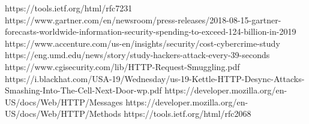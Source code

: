 \documentclass[
fontsize=11pt,
paper=a4,
abstract=true,
numbers=noenddot,
listof=totoc,
bibliography=totoc,
oneside,
cleardoublepage=plain,
parskip=half+, %
BCOR=1cm, %
]{scrreprt}
\begin{document}
















\begin{thebibliography}{00}
	 https://tools.ietf.org/html/rfc7231 
	 https://www.gartner.com/en/newsroom/press-releases/2018-08-15-gartner-forecasts-worldwide-information-security-spending-to-exceed-124-billion-in-2019
	 https://www.accenture.com/us-en/insights/security/cost-cybercrime-study
	 https://eng.umd.edu/news/story/study-hackers-attack-every-39-seconds
	 https://www.cgisecurity.com/lib/HTTP-Request-Smuggling.pdf
	 https://i.blackhat.com/USA-19/Wednesday/us-19-Kettle-HTTP-Desync-Attacks-Smashing-Into-The-Cell-Next-Door-wp.pdf
	 https://developer.mozilla.org/en-US/docs/Web/HTTP/Messages
	 https://developer.mozilla.org/en-US/docs/Web/HTTP/Methods
	 https://tools.ietf.org/html/rfc2068
	
\end{thebibliography}	
\end{document}
